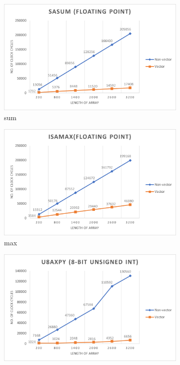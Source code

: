 \documentclass[12pt]{article}
\begin{document}
\begin{figure}[H]
     \centering
     \begin{subfigure}[b]{0.4\textwidth}
         \centering
         \includegraphics[width=\textwidth]{sasum_floating.png}
         \caption{sum}
     \end{subfigure}
     \hfill
     \begin{subfigure}[b]{0.4\textwidth}
         \centering
         \includegraphics[width=\textwidth]{isamax.png}
         \caption{max}
         \end{subfigure}
     \hfill
     \begin{subfigure}[b]{0.4\textwidth}
         \centering
         \includegraphics[width=\textwidth]{u8axpy.png}

\end{subfigure}
\end{figure}
\end{document}
